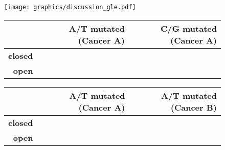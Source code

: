 \begin{figure}[h!]
  \begin{minipage}[c]{\textwidth}
    \texttt{[image: graphics/discussion\_gle.pdf]}
  \end{minipage}\hfill
  \vspace{1cm}
  
  \begin{minipage}[c]{0.48\textwidth}
  \centering
    \begin{tabulary}{\columnwidth}{rRR}
    \toprule
        & \textbf{A/T mutated (Cancer A)} &  \textbf{C/G mutated (Cancer A)} \\
    \hline
        \textbf{closed} &  &   \\
        \textbf{open} &  &   \\
    \bottomrule
    \end{tabulary}
  \end{minipage}\hfill
  \begin{minipage}[c]{0.48\textwidth}
    \begin{tabulary}{\columnwidth}{rRR}
    \toprule
        & \textbf{A/T mutated (Cancer A)} &  \textbf{A/T mutated (Cancer B)} \\
    \hline
        \textbf{closed} &  &   \\
        \textbf{open} &  &   \\
    \bottomrule
    \end{tabulary}
  \end{minipage}
  \vspace{0.8cm}
  
  \begin{minipage}[c]{\textwidth}
    \caption{
    } \label{fig:discussion_gle}
  \end{minipage}
\end{figure}
